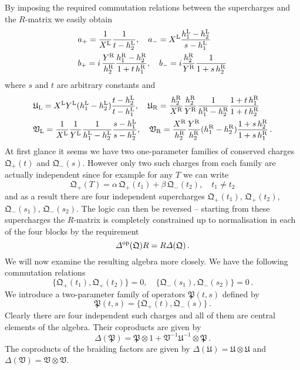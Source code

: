 \documentclass[12pt,a4paper]{article}
\numberwithin{equation}{section}
\newcommand{\kQ}{\mathfrak{Q}}
\newcommand{\kU}{\mathfrak{U}}
\newcommand{\kP}{\mathfrak{P}}
\newcommand{\kV}{\mathfrak{V}}
\begin{document}
By imposing the required commutation relations between the supercharges and the $R$-matrix we easily obtain 
\begin{equation}
\begin{split}
& a_+ =\frac{1}{X^{\rm L}}\frac{1}{t-h_2^{\rm L}},\quad a_- = X^{\rm L} \frac{h_1^{\rm L}-h_2^{\rm L}}{s-h_1^{\rm L}}\\
& b_+ = i\, \frac{Y^{\rm R}}{h_2^{\rm R}}\frac{h_1^{\rm R}-h_2^{\rm R}}{1+t\, h_1^{\rm R}},\quad b_- = i\frac{h_2^{\rm R}}{Y^{\rm R}}\frac{1}{1+s\, h_2^{\rm R}}
\end{split}
\end{equation}
where $s$ and $t$ are arbitrary constants and 
\begin{equation}
\begin{split}
& \kU_{\rm L} = X^{\rm L} Y^{\rm L} (h_1^{\rm L}-h_2^{\rm L})\frac{t-h_2^{\rm L}}{t-h_1^{\rm L}},\quad \kU_{\rm R}=\frac{h_2^{\rm R}}{X^{\rm R}}\frac{h_2^{\rm R}}{Y^{\rm R}}\frac{1}{h_1^{\rm R}-h_2^{\rm R}}\frac{1+t\,h_1^{\rm R}}{1+t\,h_2^{\rm R}}\\
& \kV_{\rm L}=\frac{1}{X^{\rm L}}\frac{1}{Y^{\rm L}}\frac{1}{h_1^{\rm L}-h_2^{\rm L}}\frac{s-h_1^{\rm L}}{s-h_2^{\rm L}},\quad \kV_{\rm R}=\frac{X^{\rm R}}{h_2^{\rm R}}\frac{Y^{\rm R}}{h_2^{\rm R}}(h_1^{\rm R}-h_2^{\rm R})\frac{1+s\, h_2^{\rm R}}{1+s\,h_1^{\rm R}}\,.
\end{split}
\end{equation} 
At first glance it seems we have two one-parameter families of conserved charges $\kQ_+(t)$ and $\kQ_-(s)$. However only two such charges from each family are actually independent since for example for any $T$ we can write 
\begin{equation}
\kQ_+(T) = \alpha\, \kQ_+(t_1)+\beta\, \kQ_-(t_2),\quad t_1\neq t_2
\end{equation}
and as a result there are four independent supercharges $\kQ_+(t_1)$, $\kQ_+(t_2)$, $\kQ_-(s_1)$, $\kQ_-(s_2)$.
The logic can then be reversed -- starting from these supercharges the $R$-matrix is completely constrained up to normalisation in each of the four blocks by the requirement 
\begin{equation}
\Delta^{\rm op}(\kQ)R = R \Delta(\kQ)\,.
\end{equation}
We will now examine the resulting algebra more closely. We have the following commutation relations
\begin{equation}
\{\kQ_+(t_1),\kQ_+(t_2)\}=0,\quad \{\kQ_-(s_1),\kQ_-(s_2)\}=0\,.
\end{equation}
We introduce a two-parameter family of operators $\kP(t,s)$ defined by 
\begin{equation}
\kP(t,s)=\{\kQ_+(t),\kQ_-(s) \}\,.
\end{equation}
Clearly there are four independent such charges and all of them are central elements of the algebra. Their coproducts are given by 
\begin{equation}
\Delta(\kP) = \kP\otimes 1 + \kV^{-1}\kU^{-1} \otimes \kP\,.
\end{equation}
The coproducts of the braiding factors are given by $\Delta(\kU)=\kU\otimes \kU$ and $\Delta(\kV)=\kV\otimes \kV$. 
\end{document}
